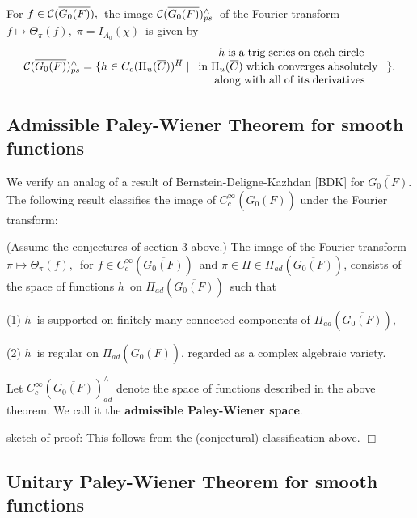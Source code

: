 \begin{lemma}
For $f\in {\cal C}(\overline{G_0(F)}),$\ the image ${\cal C}(\overline{G_0(F)%
})_{ps}^{\wedge }$\ of the Fourier transform $f\longmapsto \Theta _\pi
(f),\;\pi =I_{A_0}(\chi )$\ is given by 
\[
{\cal C}(\overline{G_0(F)})_{ps}^{\wedge }=\{h\in C_c(\Pi _u(\overline{C}%
))^H\;|\;
\begin{array}{c}
\;h\;{\rm is\;a\;trig\;series\;on\;each\;circle} \\ 
{\rm in}\;\Pi _u(\overline{C})\;{\rm which\;converges\;absolutely\;} \\ 
{\rm along\;with\;all\;of\;its\;derivatives}
\end{array}
\}.
\]
\end{lemma}

\subsection{Admissible Paley-Wiener Theorem for smooth functions}

We verify an analog of a result of Bernstein-Deligne-Kazhdan [BDK] for $%
\overline{G_0(F)}$. The following result classifies the image of $C_c^\infty
(\overline{G_0(F)})$ under the Fourier transform:

\begin{theorem}
(Assume the conjectures of section 3 above.) The image of the Fourier
transform $\pi \longmapsto \Theta _\pi (f),$\ for $f\in C_c^\infty (%
\overline{G_0(F)})$\ and $\pi \in \Pi \in \Pi _{ad}(\overline{G_0(F)})$,
consists of the space of functions $h$\ on $\Pi _{ad}(\overline{G_0(F)})$\
such that

(1) $h$\ is supported on finitely many connected components of $\Pi _{ad}(%
\overline{G_0(F)})$,

(2) $h$\ is regular on $\Pi _{ad}(\overline{G_0(F)})$, regarded as a complex
algebraic variety.
\end{theorem}

Let $C_c^\infty (\overline{G_0(F)})_{ad}^{\wedge }$ denote the space of
functions described in the above theorem. We call it the {\bf admissible
Paley-Wiener space}.

sketch of proof: This follows from the (conjectural) classification above. $%
\Box $

\subsection{Unitary Paley-Wiener Theorem for smooth functions}

